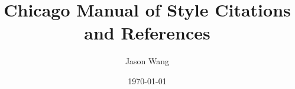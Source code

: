 \documentclass[12pt]{turabian-researchpaper}
\title{Chicago Manual of Style Citations and References}
\author{Jason Wang}
\date{\today}
\begin{document}
\begin{titlepage}
    \maketitle
\end{titlepage}



\newpage

\printbibliography
\end{document}

